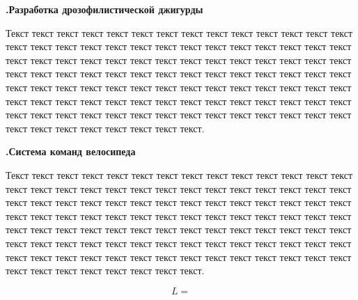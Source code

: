 \documentclass[unicode, 12pt, a4paper, oneside]{article}
\newcounter{qcnt}
\newcommand{\quest}[1]{\par\addtocounter{qcnt}{1}\textbf{\arabic{qcnt}.\quad #1}}
\begin{document}
\quest{Разработка дрозофилистической джигурды}

Текст текст текст текст текст текст текст текст текст текст текст текст текст текст текст текст текст текст текст текст текст текст текст текст текст текст текст текст текст текст текст текст текст текст текст текст текст текст текст текст текст текст текст текст текст текст текст текст текст текст текст текст текст текст текст текст текст текст текст текст текст текст текст текст текст текст текст текст текст текст текст текст текст текст текст текст текст текст текст текст текст текст текст текст текст текст текст текст текст текст текст текст текст текст текст текст текст текст текст текст текст текст текст текст текст текст.

\quest{Система команд велосипеда}

Текст текст текст текст текст текст текст текст текст текст текст текст текст текст текст текст текст текст текст текст текст текст текст текст текст текст текст текст текст текст текст текст текст текст текст текст текст текст текст текст текст текст текст текст текст текст текст текст текст текст текст текст текст текст текст текст текст текст текст текст текст текст текст текст текст текст текст текст текст текст текст текст текст текст текст текст текст текст текст текст текст текст текст текст текст текст текст текст текст текст текст текст текст текст текст текст текст текст текст текст текст текст текст текст текст текст.

$$ L =  $$
\end{document}
